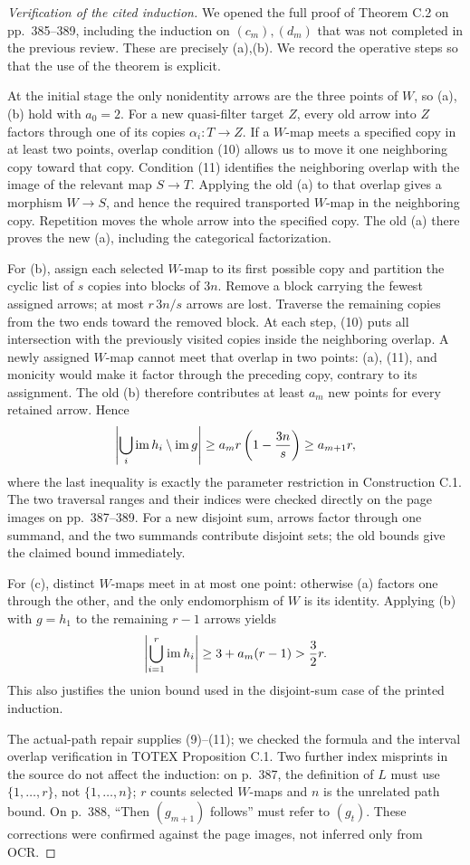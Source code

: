 \begin{proof}[Verification of the cited induction]
We opened the full proof of Theorem C.2 on pp.~385--389,
including the induction on $(c_m),(d_m)$ that was not completed
in the previous review. These are precisely (a),(b). We record
the operative steps so that the use of the theorem is explicit.

At the initial stage the only nonidentity arrows are the three
points of $W$, so (a),(b) hold with $a_0=2$. For a new
quasi-filter target $Z$, every old arrow into $Z$ factors through
one of its copies $\alpha_i:T\to Z$. If a $W$-map meets a
specified copy in at least two points, overlap condition (10)
allows us to move it one neighboring copy toward that copy.
Condition (11) identifies the neighboring overlap with the
image of the relevant map $S\to T$. Applying the old (a) to
that overlap gives a morphism $W\to S$, and hence the required
transported $W$-map in the neighboring copy. Repetition moves
the whole arrow into the specified copy. The old (a) there
proves the new (a), including the categorical factorization.

For (b), assign each selected $W$-map to its first possible
copy and partition the cyclic list of $s$ copies into blocks
of $3n$. Remove a block carrying the fewest assigned arrows;
at most $r\,3n/s$ arrows are lost. Traverse the remaining copies
from the two ends toward the removed block. At each step,
(10) puts all intersection with the previously visited copies
inside the neighboring overlap. A newly assigned $W$-map
cannot meet that overlap in two points: (a), (11), and
monicity would make it factor through the preceding copy,
contrary to its assignment. The old (b) therefore contributes
at least $a_m$ new points for every retained arrow. Hence
\[
 \left|\bigcup_i\operatorname{im} h_i\setminus\operatorname{im} g\right|
 \geq a_mr\left(1-\frac{3n}{s}\right)
 \geq a_{m+1}r,
\]
where the last inequality is exactly the parameter restriction
in Construction C.1. The two traversal ranges and their
indices were checked directly on the page images on
pp.~387--389. For a new disjoint sum, arrows factor through
one summand, and the two summands contribute disjoint sets;
the old bounds give the claimed bound immediately.

For (c), distinct $W$-maps meet in at most one point: otherwise
(a) factors one through the other, and the only endomorphism
of $W$ is its identity. Applying (b) with $g=h_1$ to the
remaining $r-1$ arrows yields
\[
 \left|\bigcup_{i=1}^{r}\operatorname{im} h_i\right|
 \geq 3+a_m(r-1)>\frac32r.
\]
This also justifies the union bound used in the disjoint-sum
case of the printed induction.

The actual-path repair supplies (9)--(11); we checked the
formula and the interval overlap verification in TOTEX
Proposition C.1. Two further index misprints in the source do
not affect the induction: on p.~387, the definition of $L$
must use $\{1,\ldots,r\}$, not $\{1,\ldots,n\}$; $r$
counts selected $W$-maps and $n$ is the unrelated path bound.
On p.~388, ``Then $(g_{m+1})$ follows'' must refer to
$(g_t)$. These corrections were confirmed against the page
images, not inferred only from OCR.
\end{proof}

